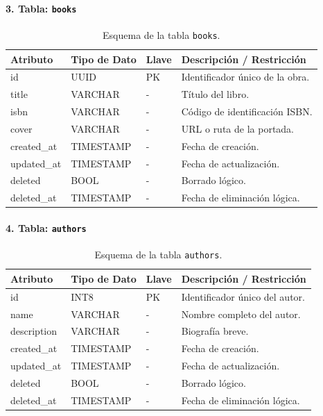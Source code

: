 \documentclass[12pt, atypical, journal]{article}
\begin{document}
\paragraph{3. Tabla: \texttt{books}}
\begin{table}[H]
	\centering
	\begin{tabular}{|l|l|l|p{6.5cm}|}
		\hline
		\textbf{Atributo} & \textbf{Tipo de Dato} & \textbf{Llave} & \textbf{Descripción / Restricción} \\ \hline
		id & UUID & PK & Identificador único de la obra. \\ \hline
		title & VARCHAR & - & Título del libro. \\ \hline
		isbn & VARCHAR & - & Código de identificación ISBN. \\ \hline
		cover & VARCHAR & - & URL o ruta de la portada. \\ \hline
		created\_at & TIMESTAMP & - & Fecha de creación. \\ \hline
		updated\_at & TIMESTAMP & - & Fecha de actualización. \\ \hline
		deleted & BOOL & - & Borrado lógico. \\ \hline
		deleted\_at & TIMESTAMP & - & Fecha de eliminación lógica. \\ \hline
	\end{tabular}
	\caption{Esquema de la tabla \texttt{books}.}
\end{table}

\paragraph{4. Tabla: \texttt{authors}}
\begin{table}[H]
	\centering
	\begin{tabular}{|l|l|l|p{6.5cm}|}
		\hline
		\textbf{Atributo} & \textbf{Tipo de Dato} & \textbf{Llave} & \textbf{Descripción / Restricción} \\ \hline
		id & INT8 & PK & Identificador único del autor. \\ \hline
		name & VARCHAR & - & Nombre completo del autor. \\ \hline
		description & VARCHAR & - & Biografía breve. \\ \hline
		created\_at & TIMESTAMP & - & Fecha de creación. \\ \hline
		updated\_at & TIMESTAMP & - & Fecha de actualización. \\ \hline
		deleted & BOOL & - & Borrado lógico. \\ \hline
		deleted\_at & TIMESTAMP & - & Fecha de eliminación lógica. \\ \hline
	\end{tabular}
	\caption{Esquema de la tabla \texttt{authors}.}
\end{table}
\end{document}
